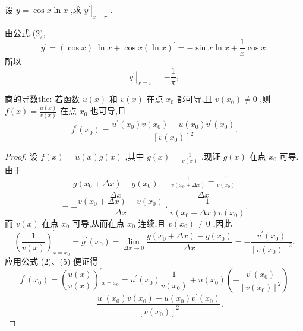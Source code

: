 \begin{example}
设 \(y = \cos x\ln x\) ,求 \({\left. {y}^{\prime }\right| }_{x = \pi }\) .
\end{example}


\begin{solution}
由公式 (2),
\[
{y}^{\prime } = {\left( \cos x\right) }^{\prime }\ln x + \cos x{\left( \ln x\right) }^{\prime } =  - \sin x\ln x + \frac{1}{x}\cos x.
\]
所以
\[
{\left. {y}^{\prime }\right| }_{x = \pi } =  - \frac{1}{\pi },
\]
\end{solution}

\begin{theorem}{商的导数}{the:}
若函数 \(u\left( x\right)\) 和 \(v\left( x\right)\) 在点 \({x}_{0}\) 都可导,且 \(v\left( {x}_{0}\right)  \neq  0\) ,则 \(f\left( x\right)  = \frac{u\left( x\right) }{v\left( x\right) }\) 在点 \({x}_{0}\) 也可导,且
\[
{f}^{\prime }\left( {x}_{0}\right)  = \frac{{u}^{\prime }\left( {x}_{0}\right) v\left( {x}_{0}\right)  - u\left( {x}_{0}\right) {v}^{\prime }\left( {x}_{0}\right) }{{\left\lbrack  v\left( {x}_{0}\right) \right\rbrack  }^{2}}. \tag{4}
\]
\end{theorem}

\begin{proof}
设 \(f\left( x\right)  = u\left( x\right) g\left( x\right)\) ,其中 \(g\left( x\right)  = \frac{1}{v\left( x\right) }\) ,现证 \(g\left( x\right)\) 在点 \({x}_{0}\) 可导. 由于
\[
\frac{g\left( {{x}_{0} + {\Delta x}}\right)  - g\left( {x}_{0}\right) }{\Delta x} = \frac{\frac{1}{v\left( {{x}_{0} + {\Delta x}}\right) } - \frac{1}{v\left( {x}_{0}\right) }}{\Delta x}
\]
\[
=  - \frac{v\left( {{x}_{0} + {\Delta x}}\right)  - v\left( {x}_{0}\right) }{\Delta x} \cdot  \frac{1}{v\left( {{x}_{0} + {\Delta x}}\right) v\left( {x}_{0}\right) },
\]
而 \(v\left( x\right)\) 在点 \({x}_{0}\) 可导,从而在点 \({x}_{0}\) 连续,且 \(v\left( {x}_{0}\right)  \neq  0\) ,因此
\[
{\left( \frac{1}{v\left( x\right) }\right) }_{x = {x}_{0}}^{\prime } = {g}^{\prime }\left( {x}_{0}\right)  = \mathop{\lim }\limits_{{{\Delta x} \rightarrow  0}}\frac{g\left( {{x}_{0} + {\Delta x}}\right)  - g\left( {x}_{0}\right) }{\Delta x} =  - \frac{{v}^{\prime }\left( {x}_{0}\right) }{{\left\lbrack  v\left( {x}_{0}\right) \right\rbrack  }^{2}}. \tag{5}
\]
应用公式 (2)、(5) 便证得
\[
{f}^{\prime }\left( {x}_{0}\right)  = {\left( \frac{u\left( x\right) }{v\left( x\right) }\right) }^{\prime }{}_{x = {x}_{0}} = {u}^{\prime }\left( {x}_{0}\right) \frac{1}{v\left( {x}_{0}\right) } + u\left( {x}_{0}\right) \left( {-\frac{{v}^{\prime }\left( {x}_{0}\right) }{{\left\lbrack  v\left( {x}_{0}\right) \right\rbrack  }^{2}}}\right)
\]
\[
= \frac{{u}^{\prime }\left( {x}_{0}\right) v\left( {x}_{0}\right)  - u\left( {x}_{0}\right) {v}^{\prime }\left( {x}_{0}\right) }{{\left\lbrack  v\left( {x}_{0}\right) \right\rbrack  }^{2}}.
\]
\end{proof}

